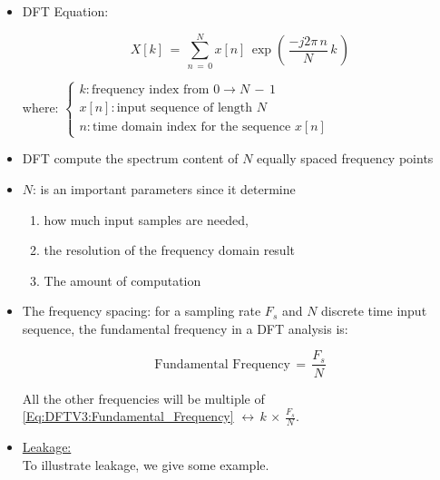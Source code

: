\documentclass[12pt,a4paper]{book}
\begin{document}
\begin{itemize}
    \item DFT Equation:
    
    
    \begin{equation}
        X[k] \, = \, \displaystyle\sum_{n \, = \, 0}^N x[n] \, \exp{\left(\, \displaystyle\frac{-j 2\pi \, n }{N} \, k \,\right)}
    \end{equation}
    
where: $\begin{cases}
k: \text{frequency index from } 0 \rightarrow N \, - \, 1 \\ 
x[n]: \text{input sequence of length }  N \\
n: \text{time domain index for the sequence } x[n]
\end{cases}$    
    
\item DFT compute the spectrum content of $N$ equally spaced frequency points    
    
\item $N$: is an important parameters since it determine 

\begin{enumerate}
    \item how much input samples are needed,
    
    \item  the resolution of the frequency domain result
    
    \item The amount of computation
\end{enumerate}
    
\item The frequency spacing: for a sampling rate $F_s$ and $N$ discrete time input sequence, the fundamental frequency in a DFT analysis is:

\begin{equation}
    \text{Fundamental Frequency} \, = \, \displaystyle\frac{F_s}{N}
    \label{Eq:DFTV3:Fundamental_Frequency}
\end{equation}

All the other frequencies will be multiple of \autoref{Eq:DFTV3:Fundamental_Frequency} $\leftrightarrow \, k \, \times \, \displaystyle\frac{F_s}{N}$.    
    
    
\newpage    
\item \underline{Leakage:}\\ 

To illustrate leakage, we give some example.


\end{itemize}
\end{document}
